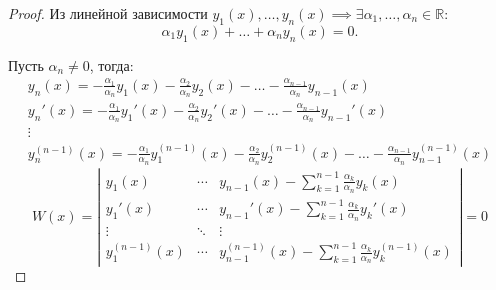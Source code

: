 \documentclass[11pt,a4paper,oneside]{report}
\theoremstyle{definition}
\theoremstyle{plain}
\theoremstyle{remark}
\begin{document}
\begin{proof}
    Из линейной зависимости $y_1(x),\ldots,y_n(x) \implies \exists \alpha_1,\ldots,\alpha_n \in \mathbb{R}$:
    \begin{equation*}
        \alpha_1y_1(x) + \ldots + \alpha_ny_n(x) = 0.
    \end{equation*}

    Пусть $\alpha_n \ne 0$, тогда:
    \begin{equation*}
        \begin{array}{l}
            y_n(x) = -\frac{\alpha_1}{\alpha_n}y_1(x) - \frac{\alpha_2}{\alpha_n}y_2(x) - \ldots - \frac{\alpha_{n-1}}{\alpha_n}y_{n-1}(x)     \\
            y_n'(x) = -\frac{\alpha_1}{\alpha_n}y_1'(x) - \frac{\alpha_2}{\alpha_n}y_2'(x) - \ldots - \frac{\alpha_{n-1}}{\alpha_n}y_{n-1}'(x) \\
            \vdots                                                                                                                             \\
            y_n^{(n-1)}(x) = -\frac{\alpha_1}{\alpha_n}y_1^{(n-1)}(x) - \frac{\alpha_2}{\alpha_n}y_2^{(n-1)}(x) - \ldots - \frac{\alpha_{n-1}}{\alpha_n}y_{n-1}^{(n-1)}(x)
        \end{array}
    \end{equation*}
    \begin{equation*}
        W(x) = \left|\begin{array}{ccc}
            y_1(x)         & \cdots & y_{n-1}(x) - \sum_{k=1}^{n-1}\frac{\alpha_k}{\alpha_n}y_k(x)                 \\
            y_1'(x)        & \cdots & y_{n-1}'(x) - \sum_{k=1}^{n-1}\frac{\alpha_k}{\alpha_n}y_k'(x)               \\
            \vdots         & \ddots & \vdots                                                                       \\
            y_1^{(n-1)}(x) & \cdots & y_{n-1}^{(n-1)}(x) - \sum_{k=1}^{n-1}\frac{\alpha_k}{\alpha_n}y_k^{(n-1)}(x)
        \end{array}\right| = 0
    \end{equation*}
\end{proof}
\end{document}
